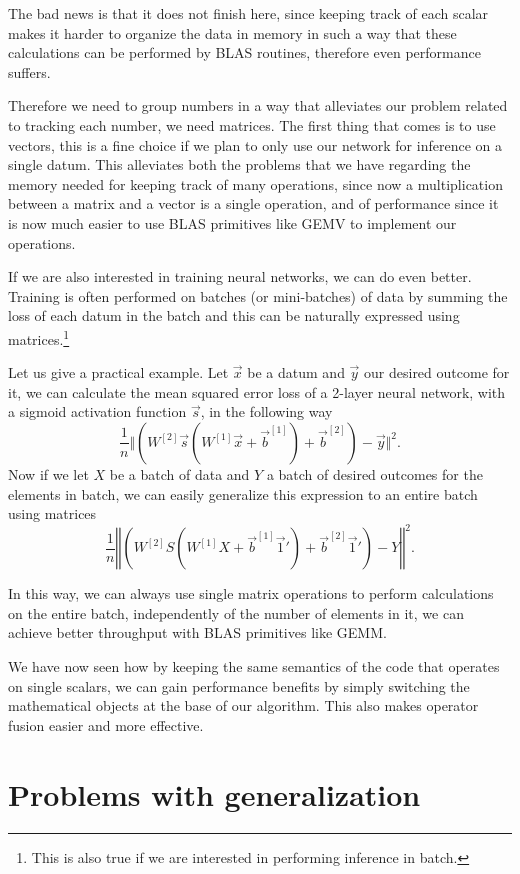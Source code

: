 \documentclass{sapthesis}
\begin{document}
The bad news is that it does not finish here, since keeping track of each scalar
makes it harder to organize the data in memory in such a way that these
calculations can be performed by BLAS routines, therefore even performance
suffers.

Therefore we need to group numbers in a way that alleviates our problem related
to tracking each number, we need matrices. The first thing that comes is to use
vectors, this is a fine choice if we plan to only use our network for inference
on a single datum. This alleviates both the problems that we have regarding the
memory needed for keeping track of many operations, since now a multiplication
between a matrix and a vector is a single operation, and of performance since it
is now much easier to use BLAS primitives like GEMV to implement our operations.

If we are also interested in training neural networks, we can do even better.
Training is often performed on batches (or mini-batches) of data by
summing the loss of each datum in the batch and this can be naturally expressed
using matrices.\footnote{This is also true if we are interested in performing
inference in batch.}

Let us give a practical example. Let \(\vec x\) be a datum and \(\vec y\) our
desired outcome for it, we can calculate the mean squared error loss of a
2-layer neural network, with a sigmoid activation function \(\vec s\), in the
following way \[\frac 1 n \Vert\left(W^{[2]} \vec s\left(W^{[1]} \vec x + \vec
b^{[1]}\right) + \vec b^{[2]}\right) - \vec y\Vert^2.\] Now if we let \(X\) be a
batch of data and \(Y\) a batch of desired outcomes for the elements in batch,
we can easily generalize this expression to an entire batch using matrices \[
    \frac 1 n \left\Vert
        \left(W^{[2]} S\!\left(W^{[1]} X + \vec b^{[1]} \vec 1'\right) + \vec b^{[2]} \vec 1'\right) - Y
    \right\Vert^2.
\]

In this way, we can always use single matrix operations to perform
calculations on the entire batch, independently of the number of elements in it,
we can achieve better throughput with BLAS primitives like GEMM.

We have now seen how by keeping the same semantics of the code that operates on
single scalars, we can gain performance benefits by simply switching the
mathematical objects at the base of our algorithm. This also makes operator
fusion easier and more effective.

\section{Problems with generalization}
\end{document}

